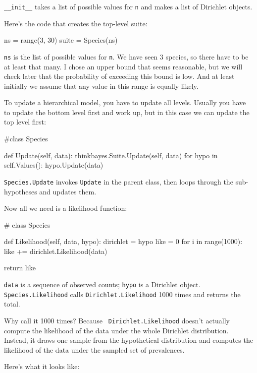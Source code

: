 \documentclass[12pt]{book}
\theoremstyle{exercise}
\begin{document}
\verb"__init__" takes a list of possible values for {\tt n} and
makes a list of Dirichlet objects.

Here's the code that creates the top-level suite:

\begin{code}
    ns = range(3, 30)
    suite = Species(ns)
\end{code}

{\tt ns} is the list of possible values for {\tt n}.  We have seen 3
species, so there have to be at least that many.  I chose an upper
bound that seems reasonable, but we will check later that the
probability of exceeding this bound is low.  And at least initially
we assume that any value in this range is equally likely.

To update a hierarchical model, you have to update all levels.
Usually you have to update the bottom
level first and work up, but in this case we can
update the top level first:

\begin{code}
#class Species

    def Update(self, data):
        thinkbayes.Suite.Update(self, data)
        for hypo in self.Values():
            hypo.Update(data)
\end{code}

{\tt Species.Update} invokes {\tt Update} in the parent class,
then loops through the sub-hypotheses and updates them.

Now all we need is a likelihood function:

\begin{code}
# class Species

    def Likelihood(self, data, hypo):
        dirichlet = hypo
        like = 0
        for i in range(1000):
            like += dirichlet.Likelihood(data)

        return like
\end{code}

{\tt data} is a sequence of
observed counts; {\tt hypo} is a Dirichlet object.
{\tt Species.Likelihood} calls
{\tt Dirichlet.Likelihood} 1000 times and returns the total.

Why call it 1000 times?  Because {\tt
  Dirichlet.Likelihood} doesn't actually compute the likelihood of the
data under the whole Dirichlet distribution.  Instead, it draws one
sample from the hypothetical distribution and computes the likelihood
of the data under the sampled set of prevalences.

Here's what it looks like:
\end{document}
